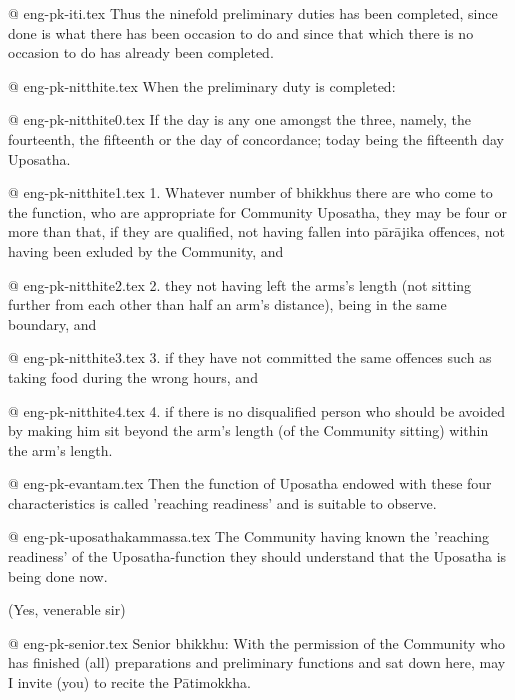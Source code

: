 @ eng-pk-iti.tex
Thus the ninefold preliminary duties has been completed, since done is what there has been occasion to do and since that which there is no occasion to do has already been completed.

@ eng-pk-nitthite.tex
When the preliminary duty is completed:

@ eng-pk-nitthite0.tex
If the day is any one amongst the three, namely, the fourteenth, the fifteenth or the day of concordance; today being the fifteenth day Uposatha.

@ eng-pk-nitthite1.tex
1. Whatever number of bhikkhus there are who come to the function, who are appropriate for Community Uposatha, they may be four or more than that, if they are qualified, not having fallen into pārājika offences, not having been exluded by the Community, and

@ eng-pk-nitthite2.tex
2. they not having left the arms's length (not sitting further from each other than half an arm's distance), being in the same boundary, and

@ eng-pk-nitthite3.tex
3. if they have not committed the same offences such as taking food during the wrong hours, and

@ eng-pk-nitthite4.tex
4. if there is no disqualified person who should be avoided by making him sit beyond the arm's length (of the Community sitting) within the arm's length.

@ eng-pk-evantam.tex
Then the function of Uposatha endowed with these four characteristics is called 'reaching readiness' and is suitable to observe.

@ eng-pk-uposathakammassa.tex
The Community having known the 'reaching readiness' of the Uposatha-function they should understand that the Uposatha is being done now.

(Yes, venerable sir)

@ eng-pk-senior.tex
Senior bhikkhu: With the permission of the Community who has finished (all) preparations and preliminary functions and sat down here, may I invite (you) to recite the Pātimokkha.
